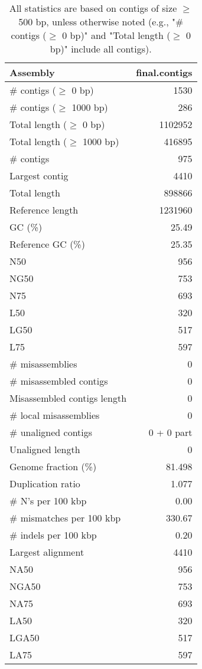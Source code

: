 \documentclass[12pt,a4paper]{article}
\begin{document}
\begin{table}[ht]
\begin{center}
\caption{All statistics are based on contigs of size $\geq$ 500 bp, unless otherwise noted (e.g., "\# contigs ($\geq$ 0 bp)" and "Total length ($\geq$ 0 bp)" include all contigs).}
\begin{tabular}{|l*{1}{|r}|}
\hline
Assembly & final.contigs \\ \hline
\# contigs ($\geq$ 0 bp) & 1530 \\ \hline
\# contigs ($\geq$ 1000 bp) & 286 \\ \hline
Total length ($\geq$ 0 bp) & 1102952 \\ \hline
Total length ($\geq$ 1000 bp) & 416895 \\ \hline
\# contigs & 975 \\ \hline
Largest contig & 4410 \\ \hline
Total length & 898866 \\ \hline
Reference length & 1231960 \\ \hline
GC (\%) & 25.49 \\ \hline
Reference GC (\%) & 25.35 \\ \hline
N50 & 956 \\ \hline
NG50 & 753 \\ \hline
N75 & 693 \\ \hline
L50 & 320 \\ \hline
LG50 & 517 \\ \hline
L75 & 597 \\ \hline
\# misassemblies & 0 \\ \hline
\# misassembled contigs & 0 \\ \hline
Misassembled contigs length & 0 \\ \hline
\# local misassemblies & 0 \\ \hline
\# unaligned contigs & 0 + 0 part \\ \hline
Unaligned length & 0 \\ \hline
Genome fraction (\%) & 81.498 \\ \hline
Duplication ratio & 1.077 \\ \hline
\# N's per 100 kbp & 0.00 \\ \hline
\# mismatches per 100 kbp & 330.67 \\ \hline
\# indels per 100 kbp & 0.20 \\ \hline
Largest alignment & 4410 \\ \hline
NA50 & 956 \\ \hline
NGA50 & 753 \\ \hline
NA75 & 693 \\ \hline
LA50 & 320 \\ \hline
LGA50 & 517 \\ \hline
LA75 & 597 \\ \hline
\end{tabular}
\end{center}
\end{table}
\end{document}
